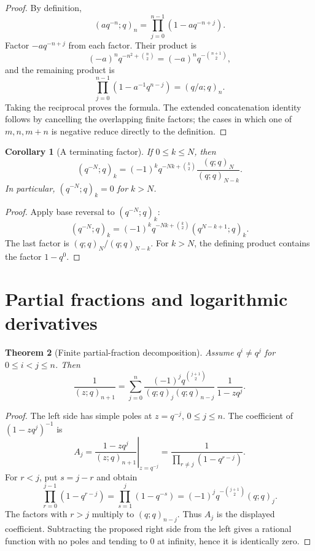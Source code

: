 \documentclass[11pt,oneside,openany]{book}
\newtheorem{theorem}{Theorem}[chapter]
\newtheorem{corollary}[theorem]{Corollary}
\theoremstyle{definition}
\theoremstyle{remark}
\begin{document}
\begin{proof}
By definition,
\[
 (aq^{-n};q)_n=\prod_{j=0}^{n-1}(1-aq^{-n+j}).
\]
Factor $-a q^{-n+j}$ from each factor.  Their product is
\[
 (-a)^nq^{-n^2+\binom n2}=(-a)^nq^{-\binom{n+1}{2}},
\]
and the remaining product is
\[
 \prod_{j=0}^{n-1}(1-a^{-1}q^{n-j})=(q/a;q)_n.
\]
Taking the reciprocal proves the formula.  The extended concatenation identity follows by cancelling the overlapping finite factors; the cases in which one of $m,n,m+n$ is negative reduce directly to the definition.
\end{proof}

\begin{corollary}[A terminating factor]\label{cor:qminusN}
If $0\le k\le N$, then
\[
 (q^{-N};q)_k=(-1)^kq^{-Nk+\binom k2}
 \frac{(q;q)_N}{(q;q)_{N-k}}.
\]
In particular, $(q^{-N};q)_k=0$ for $k>N$.
\end{corollary}

\begin{proof}
Apply base reversal to $(q^{-N};q)_k$:
\[
 (q^{-N};q)_k=(-1)^kq^{-Nk+\binom k2}(q^{N-k+1};q)_k.
\]
The last factor is $(q;q)_N/(q;q)_{N-k}$.  For $k>N$, the defining product contains the factor $1-q^0$.
\end{proof}

\section{Partial fractions and logarithmic derivatives}

\begin{theorem}[Finite partial-fraction decomposition]\label{thm:partial-fraction}
Assume $q^i\ne q^j$ for $0\le i<j\le n$.  Then
\[
 \frac{1}{(z;q)_{n+1}}
 =\sum_{j=0}^{n}
 \frac{(-1)^j q^{\binom{j+1}{2}}}
 {(q;q)_j(q;q)_{n-j}}\,
 \frac{1}{1-zq^j}.
\]
\end{theorem}

\begin{proof}
The left side has simple poles at $z=q^{-j}$, $0\le j\le n$.  The coefficient of $(1-zq^j)^{-1}$ is
\[
 A_j=\left.\frac{1-zq^j}{(z;q)_{n+1}}\right|_{z=q^{-j}}
 =\frac{1}{\prod_{r\ne j}(1-q^{r-j})}.
\]
For $r<j$, put $s=j-r$ and obtain
\[
 \prod_{r=0}^{j-1}(1-q^{r-j})
 =\prod_{s=1}^{j}(1-q^{-s})
 =(-1)^jq^{-\binom{j+1}{2}}(q;q)_j.
\]
The factors with $r>j$ multiply to $(q;q)_{n-j}$.  Thus $A_j$ is the displayed coefficient.  Subtracting the proposed right side from the left gives a rational function with no poles and tending to $0$ at infinity, hence it is identically zero.
\end{proof}
\end{document}
